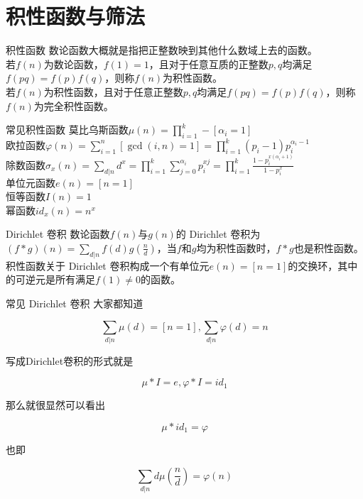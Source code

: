 \documentclass{beamer}
\begin{document}
\section{积性函数与筛法}
\begin{frame}{积性函数}
	数论函数大概就是指把正整数映到其他什么数域上去的函数。
	\\
	
	若$f(n)$为数论函数，$f(1)=1$，且对于任意互质的正整数$p,q$均满足$f(pq) = f(p)f(q)$，则称$f(n)$为积性函数。
	\\
	
	若$f(n)$为积性函数，且对于任意正整数$p,q$均满足$f(pq) = f(p)f(q)$，则称$f(n)$为完全积性函数。
\end{frame}
\begin{frame}{常见积性函数}
	莫比乌斯函数$\mu(n)=\prod\limits_{i=1}^k-[\alpha_i=1]$
	\\
	
	欧拉函数$\varphi(n)=\sum\limits_{i=1}^n[\gcd(i,n)=1]=\prod\limits_{i=1}^k(p_i-1)p_i^{\alpha_i-1}$
	\\
	
	除数函数$\sigma_x(n)=\sum\limits_{d|n}d^x=\prod\limits_{i=1}^k\sum\limits_{j=0}^{\alpha_i}p_i^{xj}=\prod\limits_{i=1}^k\frac{1-p_i^{x(\alpha_i+1)}}{1-p_i^x}$
	\\
	
	单位元函数$e(n)=[n=1]$
	\\
	
	恒等函数$I(n)=1$
	\\
	
	幂函数$id_x(n)=n^x$
\end{frame}
\begin{frame}{Dirichlet 卷积}
	数论函数$f(n)$与$g(n)$的 Dirichlet 卷积为$(f*g)(n)=\sum\limits_{d|n}f(d)g(\frac nd)$，当$f$和$g$均为积性函数时，$f * g$也是积性函数。
	\\
	
	积性函数关于 Dirichlet 卷积构成一个有单位元$e(n) = [n = 1]$的交换环，其中的可逆元是所有满足$f(1) \neq 0$的函数。

\end{frame}
\begin{frame}{常见 Dirichlet 卷积}
	\pause
	大家都知道
	
	$$\sum_{d|n}\mu(d)=[n=1],\sum_{d|n}\varphi(d)=n$$
	\pause
	
	写成Dirichlet卷积的形式就是
	
	$$\mu * I = e, \varphi * I = id_1$$
	\pause
	
	那么就很显然可以看出
	
	$$\mu * id_1 = \varphi$$
	\pause
	
	也即
	
	$$\sum_{d|n}d\mu(\frac{n}{d})=\varphi(n)$$
\end{frame}
\end{document}
